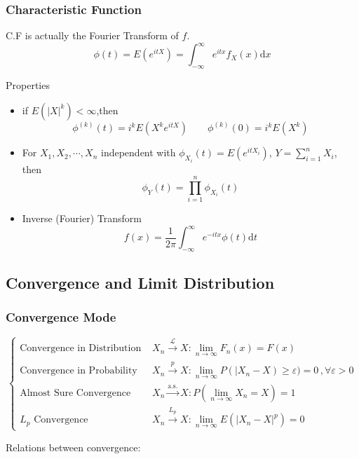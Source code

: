 \documentclass[11pt,a4paper]{ctexart}
\numberwithin{equation}{section}%
\begin{document}
\subsubsection{Characteristic Function}
    C.F is actually the Fourier Transform of $f$.
    \[
        \phi(t)=E(e^{itX}) = \int_{-\infty}^\infty e^{itx}f_X(x)\mathrm{d}x
    \]

    Properties
    \begin{itemize}
    \item if $E(|X|^k)<\infty$,then
    \[
        \phi^{(k)}(t)=i^kE(X^ke^{itX})\qquad \phi^{(k)}(0)=i^kE(X^k)    
    \]
    \item For $X_1,X_2,\cdots,X_n$ independent with $\phi_{X_i}(t)=E(e^{itX_i})$, $Y={\displaystyle \sum_{i=1}^n} X_i$, then
    \[
        \phi_Y(t)=\prod_{i=1}^n \phi_{X_i}(t)
    \]
    \item Inverse (Fourier) Transform
    \[
        f(x)=\frac{1}{2\pi}\int_{-\infty}^\infty e^{-itx}\phi(t)\mathrm{d}t    
    \]
\end{itemize}



\subsection{Convergence and Limit Distribution}
\subsubsection{Convergence Mode}
    \[
        \begin{cases}
            \text{Convergence in Distribution }&{\displaystyle X_n\xrightarrow[]{\mathscr{L}}X:\lim_{n\to\infty}F_n(x)=F(x)}\\
            \text{Convergence in Probability }&{\displaystyle X_n\xrightarrow[]{p}X:\lim_{n\to\infty}P(|X_n-X)\geq\varepsilon)=0\, ,\forall\varepsilon>0}\\
            \text{Almost Sure Convergence }&{\displaystyle X_n\xrightarrow[]{\text{a.s.}}X:P(\lim_{n\to\infty}X_n=X)=1}\\
            L_p\text{ Convergence }&{\displaystyle X_n\xrightarrow[]{L_p}X:\lim_{n\to\infty}E(|X_n-X|^p)=0}
        \end{cases}
    \]

        Relations between convergence:
        \begin{center}
        \end{center}
\end{document}
